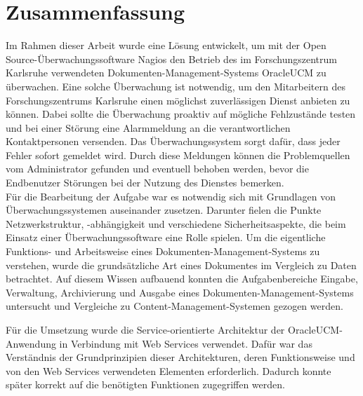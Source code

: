 \section{Zusammenfassung}

Im Rahmen dieser Arbeit wurde eine Lösung entwickelt, um mit der Open Source-Überwachungssoftware Nagios den Betrieb des im Forschungszentrum Karlsruhe verwendeten Dokumenten-Management-Systems \gls{OracleUCM} zu überwachen.
Eine solche Überwachung ist notwendig, um den Mitarbeitern des Forschungszentrums Karlsruhe einen möglichst zuverlässigen Dienst anbieten zu können.
Dabei sollte die Überwachung proaktiv auf mögliche Fehlzustände testen und bei einer Störung eine Alarmmeldung an die verantwortlichen Kontaktpersonen versenden. 
Das Überwachungssystem sorgt dafür, dass jeder Fehler sofort gemeldet wird.
Durch diese Meldungen können die Problemquellen vom Administrator gefunden und eventuell behoben werden, bevor die Endbenutzer Störungen bei der Nutzung des Dienstes bemerken.\\

Für die Bearbeitung der Aufgabe war es notwendig sich mit Grundlagen von Überwachungssystemen auseinander zusetzen.
Darunter fielen die Punkte Netzwerkstruktur, -abhängigkeit und verschiedene Sicherheitsaspekte, die beim Einsatz einer Überwachungssoftware eine Rolle spielen.
Um die eigentliche Funktions- und Arbeitsweise eines Dokumenten-Management-Systems zu verstehen, wurde die grundsätzliche Art eines Dokumentes im Vergleich zu Daten betrachtet.
Auf diesem Wissen aufbauend konnten die Aufgabenbereiche Eingabe, Verwaltung, Archivierung und Ausgabe eines Dokumenten-Management-Systems untersucht und Vergleiche zu Content-Management-Systemen gezogen werden.

Für die Umsetzung wurde die Service-orientierte Architektur der \gls{OracleUCM}-Anwendung in Verbindung mit Web Services verwendet.
Dafür war das Verständnis der Grundprinzipien dieser Architekturen, deren Funktionsweise und von den Web Services verwendeten Elementen erforderlich.
Dadurch konnte später korrekt auf die benötigten Funktionen zugegriffen werden.\\


